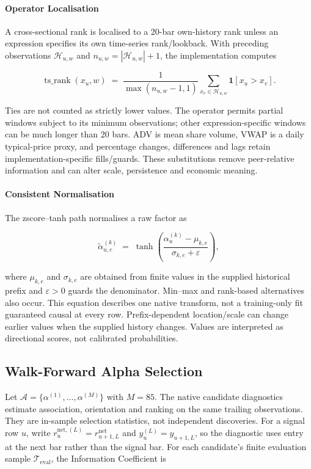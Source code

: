 \paragraph{Operator Localisation}
A cross-sectional rank is localised to a 20-bar own-history rank unless an expression specifies its own time-series rank/lookback. With preceding observations $\mathcal{H}_{u,w}$ and $n_{u,w}=|\mathcal{H}_{u,w}|+1$, the implementation computes

\begin{equation}
    \operatorname{ts\_rank}(x_u,w)
    \;=\;
    \frac{1}{\max(n_{u,w}-1,1)}
    \sum_{x_v\in\mathcal{H}_{u,w}} \mathbf{1}[x_u>x_v].
    \label{eq:ts_rank_localised}
\end{equation}


Ties are not counted as strictly lower values. The operator permits partial windows subject to its minimum observations; other expression-specific windows can be much longer than 20 bars. ADV is mean share volume, VWAP is a daily typical-price proxy, and percentage changes, differences and lags retain implementation-specific fills/guards. These substitutions remove peer-relative information and can alter scale, persistence and economic meaning.

\paragraph{Consistent Normalisation}
The zscore--tanh path normalises a raw factor as

\begin{equation}
    \tilde{\alpha}^{(k)}_{u,e}
    \;=\;
    \tanh\!\left(
        \frac{\alpha^{(k)}_u - \mu_{k,e}}{\sigma_{k,e} + \varepsilon}
    \right),
    \label{eq:alpha_norm}
\end{equation}


where $\mu_{k,e}$ and $\sigma_{k,e}$ are obtained from finite values in the supplied historical prefix and $\varepsilon>0$ guards the denominator. Min--max and rank-based alternatives also occur. This equation describes one native transform, not a training-only fit guaranteed causal at every row. Prefix-dependent location/scale can change earlier values when the supplied history changes. Values are interpreted as directional scores, not calibrated probabilities.

\subsection{Walk-Forward Alpha Selection}
Let $\mathcal{A}=\{\alpha^{(1)},\ldots,\alpha^{(M)}\}$ with $M=85$. The native candidate diagnostics estimate association, orientation and ranking on the same trailing observations. They are in-sample selection statistics, not independent discoveries. For a signal row $u$, write $r^{\mathrm{net},(L)}_u=r^{\mathrm{net}}_{u+1,L}$ and $y^{(L)}_u=y_{u+1,L}$, so the diagnostic uses entry at the next bar rather than the signal bar. For each candidate's finite evaluation sample $\mathcal{T}_{\mathrm{eval}}$, the Information Coefficient is

